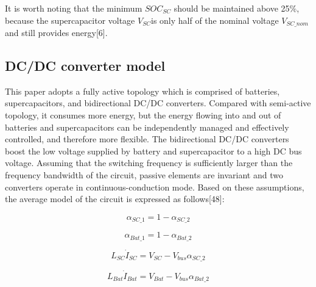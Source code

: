\documentclass[energies,article,submit,moreauthors,pdftex,10pt,a4paper]{Definitions/mdpi}
\begin{document}
It is worth noting that the minimum  $SO{C_{SC}}$ should be maintained above 25\%, because the supercapacitor voltage ${V_{SC}}$is only half of the nominal voltage ${V_{SC\_nom}}$ and still provides energy[6].
\subsection{DC/DC converter model}
This paper adopts a fully active topology which is comprised of batteries, supercapacitors, and bidirectional DC/DC converters.
%
Compared with semi-active topology, it consumes more energy, but the energy flowing into and out of batteries and supercapacitors can be independently managed and effectively controlled, and therefore more flexible.
%
The bidirectional DC/DC converters boost the low voltage supplied by battery and supercapacitor to a high DC bus voltage.
%
Assuming that the switching frequency is sufficiently larger than the frequency bandwidth of the circuit, passive elements are invariant and two converters operate in continuous-conduction mode. Based on these assumptions, the average model of the circuit is expressed as follows[48]:

\begin{equation}
{{\alpha _{SC\_1}} = 1 - {\alpha _{SC\_2}}}
\end{equation}

\begin{equation}
{{\alpha _{Bat\_1}} = 1 - {\alpha _{Bat\_2}}}
\end{equation}

\begin{equation}
{{L_{SC}}{{\dot I}_{SC}} = {V_{SC}} - {V_{bus}}{\alpha _{SC\_2}}}
\end{equation}

\begin{equation}
{{L_{Bat}}{{\dot I}_{Bat}} = {V_{Bat}} - {V_{bus}}{\alpha _{Bat\_2}}}
\end{equation}
\end{document}

